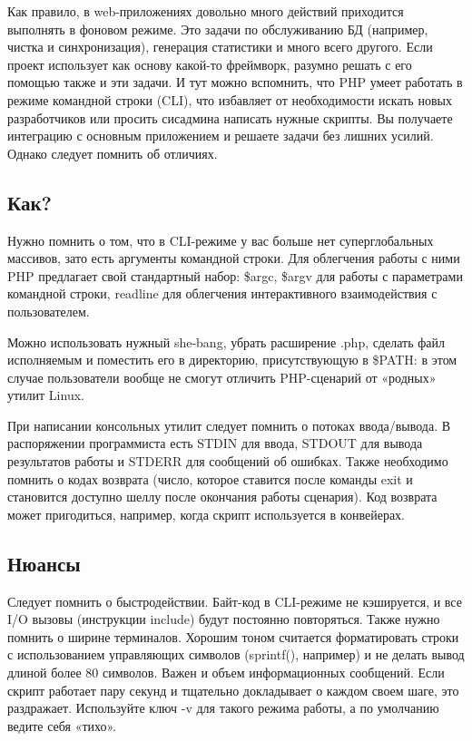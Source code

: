 \documentclass[10pt, a5paper]{article}
\begin{document}
Как правило, в web-приложениях довольно много действий приходится выполнять в фоновом режиме. Это задачи по обслуживанию БД (например, чистка и синхронизация), генерация статистики и много всего другого. Если проект использует как основу какой-то фреймворк, разумно решать с его помощью также и эти задачи. И тут можно вспомнить, что PHP умеет работать в режиме командной строки (CLI), что избавляет от необходимости искать новых разработчиков или просить сисадмина написать нужные скрипты. Вы получаете интеграцию с основным приложением и решаете задачи без лишних усилий. Однако следует помнить об отличиях.

\subsection*{Как?}

Нужно помнить о том, что в CLI-режиме  у вас больше нет суперглобальных массивов, зато есть аргументы командной строки. Для облегчения работы с ними PHP предлагает свой стандартный набор: \$argc, \$argv для работы с параметрами командной строки, readline для облегчения интерактивного взаимодействия с пользователем.

Можно использовать нужный she-bang, убрать расширение .php, сделать файл исполняемым и поместить его в директорию, присутствующую в \$PATH: в этом случае пользователи вообще не смогут отличить PHP-сценарий от «родных» утилит Linux.

При написании консольных утилит следует помнить о потоках ввода/вывода. В распоряжении программиста есть STDIN для ввода, STDOUT для вывода результатов работы и STDERR для сообщений об ошибках. Также необходимо помнить о кодах возврата (число, которое ставится после команды exit и становится доступно шеллу после окончания работы сценария). Код возврата может пригодиться, например, когда скрипт используется в конвейерах.

\subsection*{Нюансы}

Следует помнить о быстродействии. Байт-код в CLI-режиме не кэшируется, и все I/O вызовы (инструкции include) будут постоянно повторяться. Также нужно помнить о ширине терминалов. Хорошим тоном считается форматировать строки  с использованием управляющих символов (sprintf(), например) и не делать вывод длиной более 80 символов. Важен и объем информационных сообщений. Если скрипт работает пару секунд и тщательно докладывает о каждом своем шаге, это раздражает. Используйте ключ -v для такого режима работы, а по умолчанию ведите себя «тихо».
\end{document}
